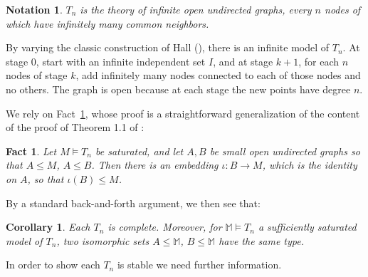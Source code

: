 \documentclass[11pt]{amsart}
\newcommand{\sidebar}[1]{\vskip10pt\noindent
 \hskip.70truein\vrule width2.0pt\hskip.5em
 \vbox{\hsize= 4truein\noindent\footnotesize\relax #1 }\vskip10pt\noindent}
\newtheorem{cor}[theorem]{Corollary}
\newtheorem{fact}[theorem]{Fact}
\newtheorem{notation}[theorem]{Notation}
\theoremstyle{definition}
\theoremstyle{remark}
\numberwithin{equation}{section}
\begin{document}
\begin{notation}\label{Tndef} $T_n$ is the theory of
infinite open undirected graphs, every $n$ nodes of which have infinitely
many common neighbors.
\end{notation}




By varying the classic construction of Hall (\cite{HP21}), there is an
infinite model of $T_n$. At stage $0$, start with an infinite independent set
$I$, and at stage $k+1$, for each $n$ nodes of stage $k$, add infinitely many
nodes connected to each of those nodes and no others. The graph is open
because at each stage the new points have degree $n$.









We rely on Fact~\ref{HP}, whose proof is a straightforward generalization of
the content of the proof of Theorem 1.1 of \cite{HP21}:

\begin{fact}\label{HP}
    Let $M \models T_n$ be saturated, and let $A, B$ be small open undirected
    graphs so that $A \leq M$, $A \leq B$. Then there is an embedding $\iota: B \to M$,
    which is the identity on $A$, so that $\iota(B) \leq M$.
\end{fact}


By a standard back-and-forth argument, we then see that:
\begin{cor} Each $T_n$ is complete. Moreover, for $\mathbb{M} \models T_{n}$ a sufficiently saturated model of $T_{n}$, two isomorphic sets $A \leq \mathbb{M}$, $B \leq \mathbb{M}$ have the same type.
\end{cor}



In order to show each $T_n$ is stable we need further information.
\end{document}
